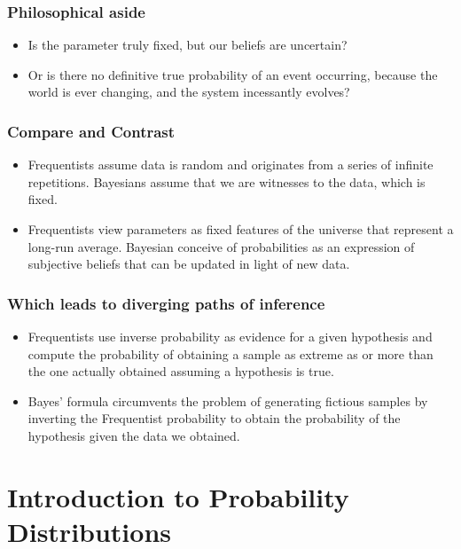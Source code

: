 \documentclass{beamer}
\begin{document}
\begin{frame}
\frametitle{Philosophical aside}

\begin{itemize}
\item Is the parameter truly fixed, but our beliefs are uncertain? 
\item Or is there no definitive true probability of an event occurring, because the world is ever changing, and the system incessantly evolves? 
\end{itemize}

\end{frame}

\begin{frame}
\frametitle{Compare and Contrast}

\begin{itemize}
\item
  Frequentists assume data is random and originates from a series of
  infinite repetitions. Bayesians assume that we are witnesses to the
  data, which is fixed.
\item
  Frequentists view parameters as fixed features of the universe that
  represent a long-run average. Bayesian conceive of probabilities as an
  expression of subjective beliefs that can be updated in light of new
  data.
\end{itemize}

\end{frame}

\begin{frame}
\frametitle{Which leads to diverging paths of inference}

\begin{itemize}
\item
Frequentists use inverse probability as evidence for a given hypothesis and compute the probability of obtaining a sample as extreme as or more than the one actually obtained assuming a hypothesis is true.
\item
Bayes' formula circumvents the problem of generating fictious samples by inverting the Frequentist probability to obtain the probability of the hypothesis given the data we obtained.
\end{itemize}

\end{frame}


\section{Introduction to Probability Distributions}
\end{document}
